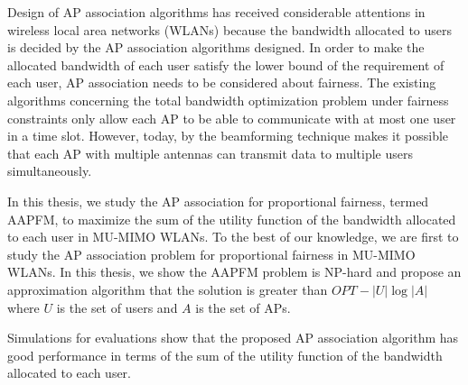 Design of AP association algorithms has received considerable attentions in wireless local area networks (WLANs) because the  bandwidth allocated to users is decided by the AP association algorithms designed. In order to make the allocated bandwidth of each user satisfy the lower bound of the requirement of each user, AP association needs to be considered about fairness. The existing algorithms concerning the total bandwidth optimization problem under fairness constraints only allow each AP to be able to communicate with at most one user in a time slot. However, today, by the beamforming technique makes it possible that each AP with multiple antennas can transmit data to multiple users simultaneously.
		
In this thesis, we study the AP association for proportional fairness, termed AAPFM, to maximize the sum of the utility function of the bandwidth allocated to each user in MU-MIMO WLANs. To the best of our knowledge, we are first to study the AP association problem for proportional fairness in MU-MIMO WLANs. In this thesis, we show the AAPFM problem is NP-hard and propose an approximation algorithm that the solution is greater than $OPT - |U|\log{|A|}$ where $U$ is the set of users and $A$ is the set of APs.
		
Simulations for evaluations show that the proposed AP association algorithm has good performance in terms of the sum of the utility function of the bandwidth allocated to each user.